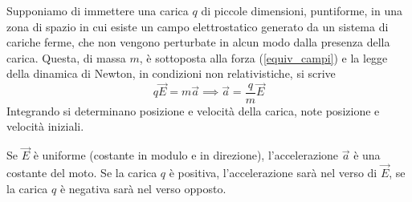 \documentclass[class=book, crop=false, oneside, 12pt]{standalone}
\begin{document}
Supponiamo di immettere una carica \(q\) di piccole dimensioni, puntiforme, in una zona di spazio in cui esiste un campo elettrostatico generato da un sistema di cariche ferme, che non vengono perturbate in alcun modo dalla presenza della carica. 
Questa, di massa \(m\), è sottoposta alla forza (\ref{equiv_campi}) e la legge della dinamica di Newton, in condizioni non relativistiche, si scrive
\begin{equation}
    q \overrightarrow{E} = m \overrightarrow{a} \implies \overrightarrow{a} = \frac{q}{m} \overrightarrow{E}
\end{equation}
Integrando si determinano posizione e velocità della carica, note posizione e velocità iniziali. 

Se \(\overrightarrow{E}\) è uniforme (costante in modulo e in direzione), l'accelerazione \(\overrightarrow{a}\) è una costante del moto. 
Se la carica \(q\) è positiva, l'accelerazione sarà nel verso di \(\overrightarrow{E}\), se la carica \(q\) è negativa sarà nel verso opposto.
\end{document}
